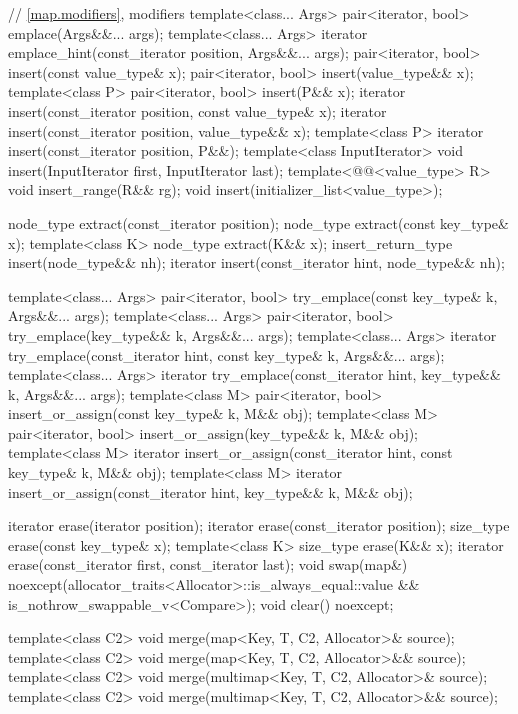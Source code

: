 \begin{codeblock}
{{    // \ref{map.modifiers}, modifiers
    template<class... Args> pair<iterator, bool> emplace(Args&&... args);
    template<class... Args> iterator emplace_hint(const_iterator position, Args&&... args);
    pair<iterator, bool> insert(const value_type& x);
    pair<iterator, bool> insert(value_type&& x);
    template<class P> pair<iterator, bool> insert(P&& x);
    iterator insert(const_iterator position, const value_type& x);
    iterator insert(const_iterator position, value_type&& x);
    template<class P>
      iterator insert(const_iterator position, P&&);
    template<class InputIterator>
      void insert(InputIterator first, InputIterator last);
    template<@@<value_type> R>
      void insert_range(R&& rg);
    void insert(initializer_list<value_type>);

    node_type extract(const_iterator position);
    node_type extract(const key_type& x);
    template<class K> node_type extract(K&& x);
    insert_return_type insert(node_type&& nh);
    iterator           insert(const_iterator hint, node_type&& nh);

    template<class... Args>
      pair<iterator, bool> try_emplace(const key_type& k, Args&&... args);
    template<class... Args>
      pair<iterator, bool> try_emplace(key_type&& k, Args&&... args);
    template<class... Args>
      iterator try_emplace(const_iterator hint, const key_type& k, Args&&... args);
    template<class... Args>
      iterator try_emplace(const_iterator hint, key_type&& k, Args&&... args);
    template<class M>
      pair<iterator, bool> insert_or_assign(const key_type& k, M&& obj);
    template<class M>
      pair<iterator, bool> insert_or_assign(key_type&& k, M&& obj);
    template<class M>
      iterator insert_or_assign(const_iterator hint, const key_type& k, M&& obj);
    template<class M>
      iterator insert_or_assign(const_iterator hint, key_type&& k, M&& obj);

    iterator  erase(iterator position);
    iterator  erase(const_iterator position);
    size_type erase(const key_type& x);
    template<class K> size_type erase(K&& x);
    iterator  erase(const_iterator first, const_iterator last);
    void      swap(map&)
      noexcept(allocator_traits<Allocator>::is_always_equal::value &&
               is_nothrow_swappable_v<Compare>);
    void      clear() noexcept;

    template<class C2>
      void merge(map<Key, T, C2, Allocator>& source);
    template<class C2>
      void merge(map<Key, T, C2, Allocator>&& source);
    template<class C2>
      void merge(multimap<Key, T, C2, Allocator>& source);
    template<class C2>
      void merge(multimap<Key, T, C2, Allocator>&& source);

}}
\end{codeblock}
